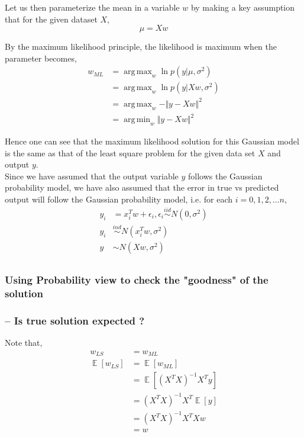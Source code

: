 \documentclass{article}
\DeclareMathOperator*{\argmax}{arg\,max}
\DeclareMathOperator*{\argmin}{arg\,min}
\DeclareMathOperator*{\E}{\mathop{\mathbb{E}}}
\begin{document}
Let us then parameterize the mean in a variable $w$ by making a key assumption that for the given dataset $X$,
\begin{equation*}
    \mu = Xw
\end{equation*}

By the maximum likelihood principle, the likelihood is maximum when the parameter becomes, 
\begin{align*}
    w_{ML} &= \argmax_w \ln{p(y\vert \mu, \sigma^2)}\\
        &= \argmax_w \ln{p(y\vert Xw, \sigma^2)}\\
        & = \argmax_w -\Vert y-Xw \Vert^2\\
        & = \argmin_w \Vert y-Xw \Vert^2
\end{align*}

Hence one can see that the maximum likelihood solution for this Gaussian model is the same as that of the least square problem for the given data set $X$ and output $y$.\\
Since we have assumed that the output variable $y$ follows the Gaussian probability model, we have also assumed that the error in true vs predicted output will follow the Gaussian probability model, i.e. for each $i = 0,1,2,\dots n$,
\begin{align*}
    y_i &= x_i^Tw+\epsilon_i, \epsilon_i \stackrel{iid}{\sim} N(0,\sigma^2)\\
    y_i &\stackrel{ind}{\sim} N(x_i^Tw,\sigma^2)\\
    y &\sim N(Xw,\sigma^2)\\
\end{align*}

\subsubsection{Using Probability view to check the "goodness" of the solution}

\subsubsection{-- Is true solution expected ?}

Note that,
\begin{align*}
    w_{LS} &= w_{ML}\\
    \E[w_{LS}] &= \E[w_{ML}]\\
    &= \E[(X^TX)^{-1}X^Ty]\\
    &= (X^TX)^{-1}X^T\E[y]\\
    &= (X^TX)^{-1}X^TXw\\
    &= w\\
\end{align*}
\end{document}
